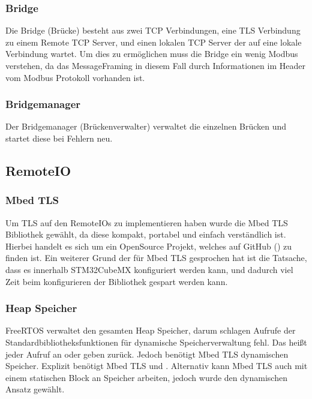 \documentclass[letterpaper,10pt,ngerman]{sphinxmanual}
\begin{document}
\subsubsection{Bridge}
\label{\detokenize{seccom:id1}}
Die Bridge (Brücke) besteht aus zwei TCP Verbindungen, eine TLS Verbindung zu einem Remote TCP Server, und einen lokalen TCP Server der auf eine lokale Verbindung wartet.
Um dies zu ermöglichen muss die Bridge ein wenig Modbus verstehen, da das Message\sphinxhyphen{}Framing in diesem Fall durch Informationen im Header vom Modbus Protokoll vorhanden ist.


\subsubsection{Bridgemanager}
\label{\detokenize{seccom:id2}}
Der Bridgemanager (Brückenverwalter) verwaltet die einzelnen Brücken und startet diese bei Fehlern neu.



\subsection{Remote\sphinxhyphen{}IO}
\label{\detokenize{seccom:remote-io}}



\subsubsection{Mbed TLS}
\label{\detokenize{seccom:mbed-tls}}
Um TLS auf den Remote\sphinxhyphen{}IOs zu implementieren haben wurde die Mbed TLS Bibliothek gewählt, da diese kompakt, portabel und einfach verständlich ist. Hierbei handelt es sich um ein Open\sphinxhyphen{}Source Projekt, welches auf GitHub () zu finden ist. Ein weiterer Grund der für Mbed TLS gesprochen hat ist die Tatsache, dass es innerhalb STM32CubeMX konfiguriert werden kann, und dadurch viel Zeit beim konfigurieren der Bibliothek gespart werden kann.


\subsubsection{Heap Speicher}
\label{\detokenize{seccom:heap-speicher}}
FreeRTOS verwaltet den gesamten Heap Speicher, darum schlagen Aufrufe der Standardbibliotheksfunktionen für dynamische Speicherverwaltung fehl. Das heißt jeder Aufruf an  oder  geben  zurück. Jedoch benötigt Mbed TLS dynamischen Speicher. Explizit benötigt Mbed TLS  und . Alternativ kann Mbed TLS auch mit einem statischen Block an Speicher arbeiten, jedoch wurde den dynamischen Ansatz gewählt.
\end{document}
